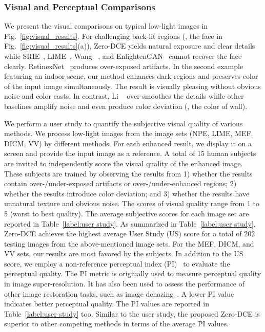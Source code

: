\documentclass[10pt,twocolumn,letterpaper]{article}
\begin{document}
\subsubsection{Visual and Perceptual Comparisons}
We present the visual comparisons on typical low-light images in Fig.~\ref{fig:visual_results}.
For challenging back-lit regions (\eg, the face in Fig.~\ref{fig:visual_results}(a)), Zero-DCE yields natural exposure and clear details while SRIE~\cite{Fu2016}, LIME~\cite{Guo2017}, Wang \etal~\cite{Wang2019}, and EnlightenGAN~\cite{Jiang2019} cannot recover the face clearly. RetinexNet~\cite{Chen2018} produces over-exposed artifacts.
In the second example featuring an indoor scene, our method enhances dark regions and preserves color of the input image simultaneously. The result is visually pleasing without obvious noise and color casts.
In contrast,  Li \etal~\cite{Li2018} over-smoothes the details while other baselines amplify noise and even produce color deviation (\eg, the color of wall).



We perform a user study to quantify the subjective visual quality of various methods.
We process low-light images from the image sets (NPE, LIME, MEF, DICM, VV) by different methods.
For each enhanced result, we display it on a screen and provide the input image as a reference.
A total of 15 human subjects are invited to independently score the visual quality of the enhanced image.
These subjects are trained by observing the results from 1) whether the results contain over-/under-exposed artifacts or over-/under-enhanced regions; 2) whether the results introduce color deviation; and 3) whether the results have unnatural texture and obvious noise.
The scores of visual quality range from 1 to 5 (worst to best quality). The average subjective scores for each image set are reported in Table~\ref{label:user study}.
As summarized in Table~\ref{label:user study}, Zero-DCE achieves the highest average User Study (US) score for a total of 202 testing images from the above-mentioned image sets.
For the MEF, DICM, and VV sets, our results are most favored by the subjects.
In addition to the US score, we employ a non-reference perceptual index (PI)~\cite{PI,Ma2017,NIQE} to evaluate the perceptual quality. The PI metric is originally used to measure perceptual quality in image super-resolution. It has also been used to assess the performance of other image restoration tasks, such as image dehazing~\cite{Qu2019}. A lower PI value indicates better perceptual quality. The PI values are reported in Table~\ref{label:user study} too.
Similar to the user study, the proposed Zero-DCE is superior to other competing methods in terms of the average PI values.
\end{document}
